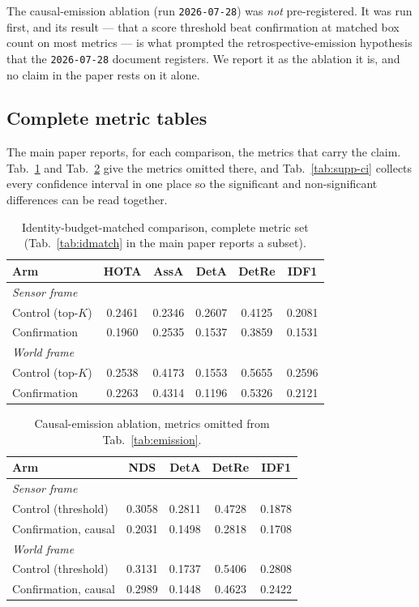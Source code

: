 The causal-emission ablation (run \texttt{2026-07-28}) was \emph{not}
pre-registered. It was run first, and its result --- that a score threshold
beat confirmation at matched box count on most metrics --- is what prompted
the retrospective-emission hypothesis that the \texttt{2026-07-28} document
registers. We report it as the ablation it is, and no claim in the paper rests
on it alone.

\subsection{Complete metric tables}
\label{sec:supp-tables}

The main paper reports, for each comparison, the metrics that carry the claim.
Tab.~\ref{tab:supp-idmatch} and Tab.~\ref{tab:supp-emission} give the metrics
omitted there, and Tab.~\ref{tab:supp-ci} collects every confidence interval
in one place so the significant and non-significant differences can be read
together.

\begin{table}[h]
\centering\small
\setlength{\tabcolsep}{3pt}
\begin{tabular}{lccccc}
\toprule
Arm & HOTA & AssA & DetA & DetRe & IDF1 \\
\midrule
\multicolumn{6}{l}{\emph{Sensor frame}} \\
Control (top-$K$) & 0.2461 & 0.2346 & 0.2607 & 0.4125 & 0.2081 \\
Confirmation      & 0.1960 & 0.2535 & 0.1537 & 0.3859 & 0.1531 \\
\midrule
\multicolumn{6}{l}{\emph{World frame}} \\
Control (top-$K$) & 0.2538 & 0.4173 & 0.1553 & 0.5655 & 0.2596 \\
Confirmation      & 0.2263 & 0.4314 & 0.1196 & 0.5326 & 0.2121 \\
\bottomrule
\end{tabular}
\caption{Identity-budget-matched comparison, complete metric set
(Tab.~\ref{tab:idmatch} in the main paper reports a subset).}
\label{tab:supp-idmatch}
\end{table}

\begin{table}[h]
\centering\small
\setlength{\tabcolsep}{3pt}
\begin{tabular}{lcccc}
\toprule
Arm & NDS & DetA & DetRe & IDF1 \\
\midrule
\multicolumn{5}{l}{\emph{Sensor frame}} \\
Control (threshold)  & 0.3058 & 0.2811 & 0.4728 & 0.1878 \\
Confirmation, causal & 0.2031 & 0.1498 & 0.2818 & 0.1708 \\
\midrule
\multicolumn{5}{l}{\emph{World frame}} \\
Control (threshold)  & 0.3131 & 0.1737 & 0.5406 & 0.2808 \\
Confirmation, causal & 0.2989 & 0.1448 & 0.4623 & 0.2422 \\
\bottomrule
\end{tabular}
\caption{Causal-emission ablation, metrics omitted from
Tab.~\ref{tab:emission}.}
\label{tab:supp-emission}
\end{table}

